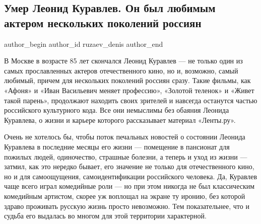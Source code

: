  
 
 
 
 
 
\subsection{Умер Леонид Куравлев. Он был любимым актером нескольких поколений россиян}
\label{sec:30_01_2022.stz.news.ru.lenta.1.leonid_kuravljev}
 
\ifcmt
 author_begin
   author_id ruzaev_denis
 author_end
\fi

\begin{zznagolos}
В Москве в возрасте 85 лет скончался Леонид Куравлев — не только один из самых
прославленных актеров отечественного кино, но и, возможно, самый любимый,
причем для нескольких поколений россиян сразу. Такие фильмы, как «Афоня» и
«Иван Васильевич меняет профессию», «Золотой теленок» и «Живет такой парень»,
продолжают находить своих зрителей и навсегда останутся частью российского
культурного кода. Все они немыслимы без обаяния Леонида Куравлева, о жизни и
карьере которого рассказывает материал «Ленты.ру».
\end{zznagolos}


Очень не хотелось бы, чтобы поток печальных новостей о состоянии Леонида
Куравлева в последние месяцы его жизни — помещение в пансионат для пожилых
людей, одиночество, страшные болезни, а теперь и уход из жизни — затмил, как
это нередко бывает, его значение не только для отечественного кино, но и для
самоощущения, самоидентификации российского человека. Да, Куравлев чаще всего
играл комедийные роли — но при этом никогда не был классическим комедийным
артистом, скорее уж воплощал на экране ту иронию, без которой здраво проживать
русскую жизнь просто невозможно. Тем показательнее, что и судьба его выдалась
во многом для этой территории характерной.


